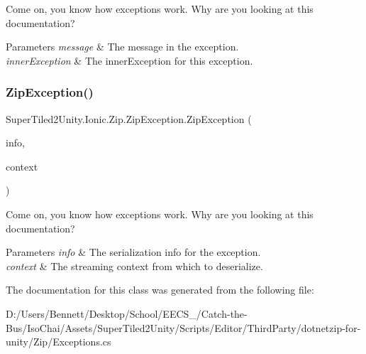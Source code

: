 Come on, you know how exceptions work. Why are you looking at this documentation? 


\begin{DoxyParams}{Parameters}
{\em message} & The message in the exception.\\
\hline
{\em inner\+Exception} & The inner\+Exception for this exception.\\
\hline
\end{DoxyParams}
\mbox{\label{class_super_tiled2_unity_1_1_ionic_1_1_zip_1_1_zip_exception_af19312b03a624c314e71dd8fc8dd7982}} 
\subsubsection{\texorpdfstring{Zip\+Exception()}{ZipException()}\hspace{0.1cm}{\footnotesize\ttfamily [4/4]}}
{\footnotesize\ttfamily Super\+Tiled2\+Unity.\+Ionic.\+Zip.\+Zip\+Exception.\+Zip\+Exception (\begin{DoxyParamCaption}\item[{Serialization\+Info}]{info,  }\item[{Streaming\+Context}]{context }\end{DoxyParamCaption})\hspace{0.3cm}{\ttfamily [protected]}}



Come on, you know how exceptions work. Why are you looking at this documentation? 


\begin{DoxyParams}{Parameters}
{\em info} & The serialization info for the exception.\\
\hline
{\em context} & The streaming context from which to deserialize.\\
\hline
\end{DoxyParams}


The documentation for this class was generated from the following file\+:\begin{DoxyCompactItemize}
\item 
D\+:/\+Users/\+Bennett/\+Desktop/\+School/\+E\+E\+C\+S\+\_/\+Catch-\/the-\/\+Bus/\+Iso\+Chai/\+Assets/\+Super\+Tiled2\+Unity/\+Scripts/\+Editor/\+Third\+Party/dotnetzip-\/for-\/unity/\+Zip/Exceptions.\+cs\end{DoxyCompactItemize}
